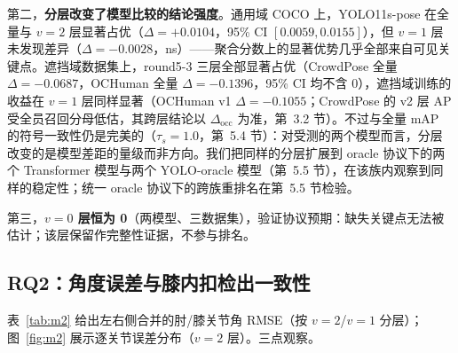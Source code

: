 \documentclass[10pt,conference]{IEEEtran}
\begin{document}
第二，\textbf{分层改变了模型比较的结论强度}。通用域 COCO 上，YOLO11s-pose 在全量与 $v{=}2$ 层显著占优（$\Delta=+0.0104$，95\% CI $[0.0059,0.0155]$），但 $v{=}1$ 层未发现差异（$\Delta=-0.0028$，ns）——聚合分数上的显著优势几乎全部来自可见关键点。遮挡域数据集上，round5-3 三层全部显著占优（CrowdPose 全量 $\Delta=-0.0687$，OCHuman 全量 $\Delta=-0.1396$，95\% CI 均不含 0），遮挡域训练的收益在 $v{=}1$ 层同样显著（OCHuman v1 $\Delta=-0.1055$；CrowdPose 的 v2 层 AP 受全员召回分母低估，其跨层结论以 $\Delta_{\mathrm{occ}}$ 为准，第~3.2 节）。不过与全量 mAP 的符号一致性仍是完美的（$\tau_s=1.0$，第~5.4 节）：对受测的两个模型而言，分层改变的是模型差距的量级而非方向。我们把同样的分层扩展到 oracle 协议下的两个 Transformer 模型与两个 YOLO-oracle 模型（第~5.5 节），在该族内观察到同样的稳定性；统一 oracle 协议下的跨族重排名在第~5.5 节检验。

第三，\textbf{$v{=}0$ 层恒为 0}（两模型、三数据集），验证协议预期：缺失关键点无法被估计；该层保留作完整性证据，不参与排名。

\subsection{RQ2：角度误差与膝内扣检出一致性}

表~\ref{tab:m2} 给出左右侧合并的肘/膝关节角 RMSE（按 $v{=}2$/$v{=}1$ 分层）；图~\ref{fig:m2} 展示逐关节误差分布（$v{=}2$ 层）。三点观察。

\begin{table}[t]
\centering
\caption{M2 关节角 RMSE（$^{\circ}$，左右侧按实例合并）。粗体 $=$ 显著占优（bootstrap CI 不含 0）；逐项比较的 CI 见附录~A（表~A3）。}
\label{tab:m2}
\renewcommand{\arraystretch}{1.15}
\end{table}
\end{document}
